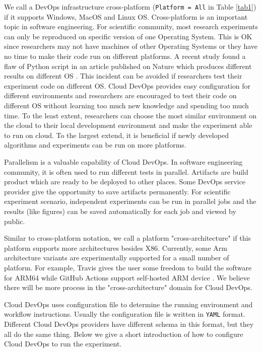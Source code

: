 \documentclass[10pt, conference, compsocconf]{IEEEtran}
\begin{document}
We call a DevOps infrastructure cross-platform (\texttt{Platform = All} in Table  \ref{tab1}) if it supports Windows, MacOS and Linux 
OS.
Cross-platform is an important topic in software engineering. For scientific community, most research experiments can only be reproduced on specific version of one Operating System. This is OK since researchers may not have machines of other Operating Systems or they have no time to make their code run on different platforms. A recent study found a flaw of Python script in an article published on Nature which produces different results on different OS \cite{bhandari2019characterization}. This incident can be avoided if researchers test their experiment code on different OS. Cloud DevOps provides easy configuration for different environments and researchers are encouraged to test their code on different OS without learning too much new knowledge and spending too much time. To the least extent, researchers can choose the most similar environment on the cloud to their local development environment and make the experiment able to run on cloud. To the largest extend, it is beneficial if newly developed algorithms and experiments can be run on more platforms.

Parallelism is a valuable capability of Cloud DevOps. In software engineering community, it is often used to run different tests in parallel.
Artifacts are build product which are ready to be deployed to other places.
Some DevOps service provider give the opportunity to save artifacts permanently. For scientific experiment scenario, independent experiments can be run in parallel jobs and the results (like figures) can be saved automatically for each job and viewed by public.

Similar to cross-platform notation, we call a platform "cross-architecture" if this platform supports more architectures besides X86. Currently, some Arm architecture variants are experimentally supported for a small number of platform. For example, Travis gives the user some freedom to build the software
for ARM64 while GitHub Actions support self-hosted ARM device \cite{travis-arm, github-selfhosted}. We believe there will be more process in the "cross-architecture" domain for Cloud DevOps. 

Cloud DevOps uses configuration file to determine the running environment and workflow instructions. 
Usually the configuration file is written in \texttt{YAML} format. Different Cloud DevOps providers have different schema in this format, but they all do the same thing. Below we give a short introduction of how to configure Cloud DevOps to run the experiment.
\end{document}
